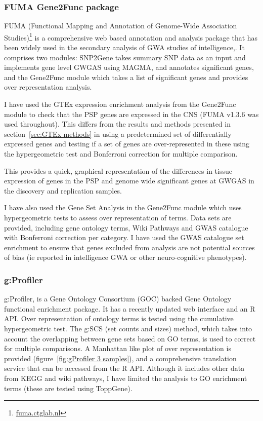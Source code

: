  


\subsubsection{FUMA Gene2Func package} 
\label{sec:FUMA go enrichment}

FUMA (Functional Mapping and Annotation of Genome-Wide Association Studies)\footnote{\url{fuma.ctglab.nl}} is a comprehensive web based annotation and analysis package\cite{watanabe2017functional} that has been widely used in the secondary analysis of GWA studies of intelligence\cite{hill2019combined},\cite{savage2018genome}. It comprises two modules: SNP2Gene takes summary SNP data as an input and implements gene level GWGAS using MAGMA, and annotates significant genes, and the Gene2Func module which takes a list of significant genes and provides over representation analysis.

I have used the GTEx expression enrichment analysis from the Gene2Func module to check that the PSP genes are expressed in the CNS (FUMA v1.3.6 was used throughout). This differs from the results and methods presented in section~\ref{sec:GTEx methods} in using a predetermined set of differentially expressed genes and testing if a set of genes are over-represented in these using the hypergeometric test and Bonferroni correction for multiple comparison.

This provides a quick, graphical representation of the differences in tissue expression of genes in the PSP and genome wide significant genes at GWGAS in the discovery and replication samples.

I have also used the Gene Set Analysis in the Gene2Func module which uses hypergeometric tests to assess over representation of terms. Data sets are provided, including gene ontology terms, Wiki Pathways and GWAS catalogue with Bonferroni correction per category. I have used the GWAS catalogue set enrichment to ensure that genes excluded from analysis are not potential sources of bias (ie reported in intelligence GWA or other neuro-cognitive phenotypes).

\subsubsection{g:Profiler} 
\label{sec:gProfiler GO enrichment}
g:Profiler, is a  Gene Ontology Consortium (GOC) backed Gene Ontology functional enrichment package. It has a recently updated web interface and an R API. Over representation of ontology terms is tested using the cumulative hypergeometric test\cite{raudvere2019g}. The g:SCS (set counts and sizes) method, which takes into account the overlapping between gene sets based on GO terms\cite{reimand2007g}, is used to correct for multiple comparisons.  A Manhattan like plot of over representation is provided (figure~\ref{fig:gProfiler 3 samples}),  and a comprehensive translation service that can be accessed from the R API. Although it includes other data from KEGG and wiki pathways, I have limited the analysis to GO enrichment terms (these are tested using ToppGene). 

